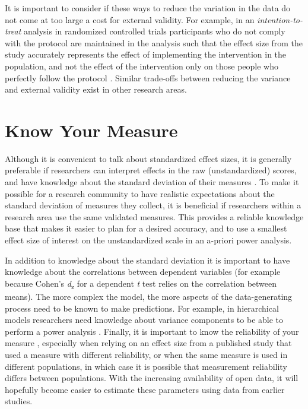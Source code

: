 \documentclass[
  oneside]{krantz}
\begin{document}
It is important to consider if these ways to reduce the variation in the data do not come at too large a cost for external validity. For example, in an \emph{intention-to-treat} analysis in randomized controlled trials participants who do not comply with the protocol are maintained in the analysis such that the effect size from the study accurately represents the effect of implementing the intervention in the population, and not the effect of the intervention only on those people who perfectly follow the protocol \citep{gupta_intention_2011}. Similar trade-offs between reducing the variance and external validity exist in other research areas.

\hypertarget{know-your-measure}{%
\section{Know Your Measure}\label{know-your-measure}}

Although it is convenient to talk about standardized effect sizes, it is generally preferable if researchers can interpret effects in the raw (unstandardized) scores, and have knowledge about the standard deviation of their measures \citep{baguley_standardized_2009, lenth_practical_2001}. To make it possible for a research community to have realistic expectations about the standard deviation of measures they collect, it is beneficial if researchers within a research area use the same validated measures. This provides a reliable knowledge base that makes it easier to plan for a desired accuracy, and to use a smallest effect size of interest on the unstandardized scale in an a-priori power analysis.

In addition to knowledge about the standard deviation it is important to have knowledge about the correlations between dependent variables (for example because Cohen's \emph{d}\textsubscript{z} for a dependent \emph{t} test relies on the correlation between means). The more complex the model, the more aspects of the data-generating process need to be known to make predictions. For example, in hierarchical models researchers need knowledge about variance components to be able to perform a power analysis \citep{westfall_statistical_2014, debruine_understanding_2021}. Finally, it is important to know the reliability of your measure \citep{parsons_psychological_2019}, especially when relying on an effect size from a published study that used a measure with different reliability, or when the same measure is used in different populations, in which case it is possible that measurement reliability differs between populations. With the increasing availability of open data, it will hopefully become easier to estimate these parameters using data from earlier studies.
\end{document}

